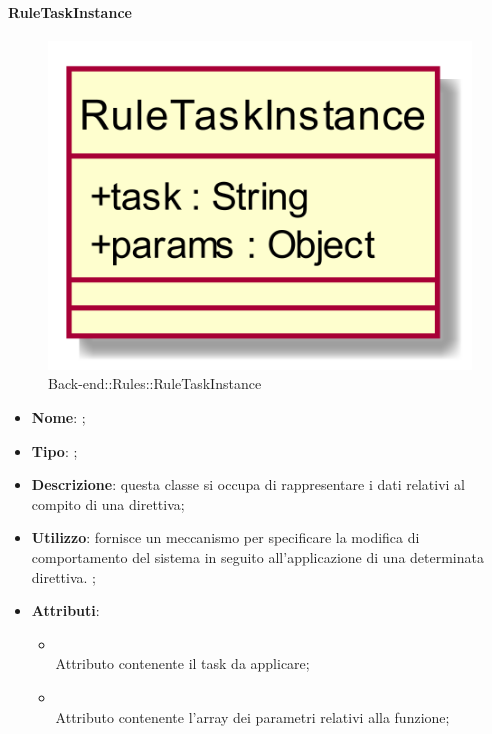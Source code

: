 \hypertarget{RuleTaskInstance_label}{\paragraph{RuleTaskInstance}}
\begin{figure}[h]
	\centering
	\includegraphics[width=\textwidth,height=\textheight,keepaspectratio]{images/ClassRuleTaskInstance.png}
	\caption{Back-end::Rules::RuleTaskInstance}
\end{figure}
\begin{itemize}
	\item \textbf{Nome}: ;
	\item \textbf{Tipo}: ;
	\item \textbf{Descrizione}: questa classe si occupa di rappresentare i dati relativi al compito di una direttiva;
	\item \textbf{Utilizzo}: fornisce un meccanismo per specificare la modifica di comportamento del sistema in seguito all'applicazione di una determinata direttiva. ;
	\item \textbf{Attributi}:
	\begin{itemize}
		\item[]  \\
		Attributo contenente il task da applicare;
		\item[]  \\
		Attributo contenente l'array dei parametri relativi alla funzione;
	\end{itemize}
\end{itemize}

